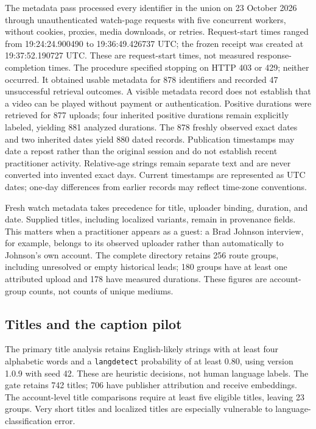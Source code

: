 The metadata pass processed every identifier in the union on 23 October 2026 through unauthenticated watch-page requests with five concurrent workers, without cookies, proxies, media downloads, or retries. Request-start times ranged from 19:24:24.900490 to 19:36:49.426737 UTC; the frozen receipt was created at 19:37:52.190727 UTC. These are request-start times, not measured response-completion times. The procedure specified stopping on HTTP 403 or 429; neither occurred. It obtained usable metadata for 878 identifiers and recorded 47 unsuccessful retrieval outcomes. A visible metadata record does not establish that a video can be played without payment or authentication. Positive durations were retrieved for 877 uploads; four inherited positive durations remain explicitly labeled, yielding 881 analyzed durations. The 878 freshly observed exact dates and two inherited dates yield 880 dated records. Publication timestamps may date a repost rather than the original session and do not establish recent practitioner activity. Relative-age strings remain separate text and are never converted into invented exact days. Current timestamps are represented as UTC dates; one-day differences from earlier records may reflect time-zone conventions.

Fresh watch metadata takes precedence for title, uploader binding, duration, and date. Supplied titles, including localized variants, remain in provenance fields. This matters when a practitioner appears as a guest: a Brad Johnson interview, for example, belongs to its observed uploader rather than automatically to Johnson's own account. The complete directory retains 256 route groups, including unresolved or empty historical leads; 180 groups have at least one attributed upload and 178 have measured durations. These figures are account-group counts, not counts of unique mediums.

\begin{table}[t]
\centering

\caption{Coverage within the frozen index. Each row has its own unit and denominator; no row estimates a platform-wide population. Caption and matched-comparison subsets are described separately in the text.}
\label{tab:coverage}
\end{table}

\subsection{Titles and the caption pilot}
The primary title analysis retains English-likely strings with at least four alphabetic words and a \texttt{langdetect} probability of at least 0.80, using version 1.0.9 with seed 42. These are heuristic decisions, not human language labels. The gate retains 742 titles; 706 have publisher attribution and receive embeddings. The account-level title comparisons require at least five eligible titles, leaving 23 groups. Very short titles and localized titles are especially vulnerable to language-classification error.

